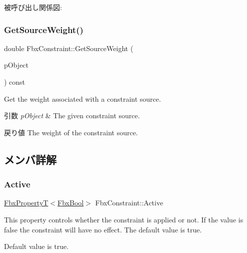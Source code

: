 被呼び出し関係図\+:
\mbox{\label{class_fbx_constraint_a4466dd54c32b822252c5e960d0be1836}} 
\subsubsection{\texorpdfstring{Get\+Source\+Weight()}{GetSourceWeight()}}
{\footnotesize\ttfamily double Fbx\+Constraint\+::\+Get\+Source\+Weight (\begin{DoxyParamCaption}\item[{const \hyperlink{class_fbx_object}{Fbx\+Object} $\ast$}]{p\+Object }\end{DoxyParamCaption}) const}

Get the weight associated with a constraint source. 
\begin{DoxyParams}{引数}
{\em p\+Object} & The given constraint source. \\
\hline
\end{DoxyParams}
\begin{DoxyReturn}{戻り値}
The weight of the constraint source. 
\end{DoxyReturn}


\subsection{メンバ詳解}
\mbox{\label{class_fbx_constraint_ab34f884cb053f5bb9c18f65582ab84e1}} 
\subsubsection{\texorpdfstring{Active}{Active}}
{\footnotesize\ttfamily \hyperlink{class_fbx_property_t}{Fbx\+PropertyT}$<$\hyperlink{fbxtypes_8h_a92e0562b2fe33e76a242f498b362262e}{Fbx\+Bool}$>$ Fbx\+Constraint\+::\+Active}

This property controls whether the constraint is applied or not. If the value is {\ttfamily false} the constraint will have no effect. The default value is {\ttfamily true}.

Default value is true. \mbox{\label{class_fbx_constraint_a591ebe51dd090af37644355200b70d9a}} 
